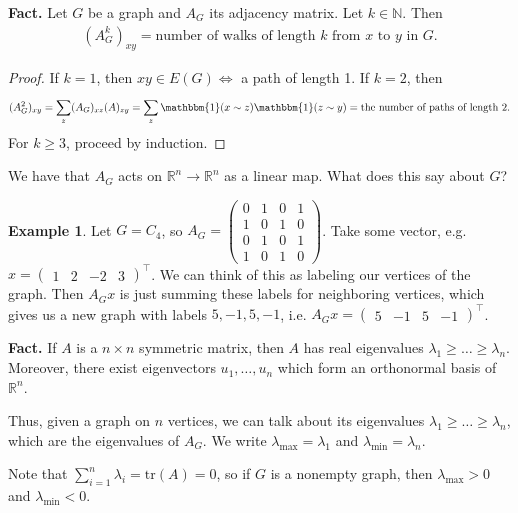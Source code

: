 \documentclass{article}
\theoremstyle{definition}
\newtheorem{example}{Example}[section]
\begin{document}
\textbf{Fact.} Let $G$ be a graph and $A_G$ its adjacency matrix. Let $k \in \mathbb{N}$. Then 
\begin{align*}
    (A_G^k)_{xy} = \text{number of walks of length }k \text{ from }x \text{ to }y \text{ in }G.
\end{align*}
\begin{proof}
    If $k=1$, then $xy \in E(G) \iff$ a path of length 1. If $k=2$, then 
    \begin{align*}
        (A_G^2)_{xy} = \sum_{z}^{} (A_G)_{xz} (A)_{zy} = \sum_{z}^{} \mathbbm{1}(x \sim z)\mathbbm{1}(z \sim y) = \text{the number of paths of length 2}.
    \end{align*}
    For $k\ge 3$, proceed by induction.
\end{proof}
We have that $A_G$ acts on $\mathbb{R}^n \to \mathbb{R}^n$ as a linear map. What does this say about $G$?
\begin{example}
    Let $G=C_4$, so $A_G = \begin{pmatrix} 0&1&0&1\\1&0&1&0\\0&1&0&1\\1&0&1&0 \end{pmatrix}$. Take some vector, e.g. $x= \begin{pmatrix} 1&2&-2&3 \end{pmatrix}^\top$. We can think of this as labeling our vertices of the graph.
    Then $A_G x$ is just summing these labels for neighboring vertices, which gives us a new graph with labels $5,-1,5,-1$, i.e. $A_G x = \begin{pmatrix} 5 & -1 & 5 & -1 \end{pmatrix}^\top$.
\end{example}
\textbf{Fact.} If $A$ is a $n \times n$ symmetric matrix, then $A$ has real eigenvalues $\lambda_1 \ge \ldots \ge \lambda_n$. Moreover, there exist eigenvectors $u_1,\ldots,u_n$ which form an orthonormal basis of $\mathbb{R}^n$.
\vspace{1mm}

Thus, given a graph on $n$ vertices, we can talk about its eigenvalues $\lambda_1 \ge \ldots \ge \lambda_n$, which are the eigenvalues of $A_G$. We write $\lambda_{\max} = \lambda_1$ and $\lambda_{\min}= \lambda_n$.
\vspace{1mm}

Note that $\sum_{i=1}^{n} \lambda_i = \text{tr}(A) = 0$, so if $G$ is a nonempty graph, then $\lambda_{\max}>0$ and $\lambda_{\min}<0$.
\vspace{1mm}
\end{document}

